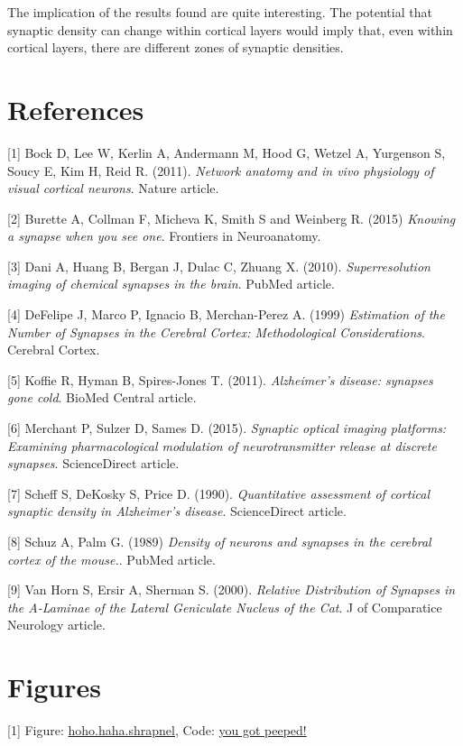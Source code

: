 \documentclass{article}
\begin{document}
The implication of the results found are quite interesting. The potential that synaptic density can change within cortical layers would imply that, even within cortical layers, there are different zones of synaptic densities.

\section{References}

[1] Bock D, Lee W, Kerlin A, Andermann M, Hood G, Wetzel A, Yurgenson S, Soucy E, Kim H, Reid R. (2011). {\it Network anatomy and in vivo physiology of visual cortical neurons}. Nature article.

[2] Burette A, Collman F, Micheva K, Smith S and Weinberg R. (2015) {\it Knowing a synapse when you see one}. Frontiers in Neuroanatomy.

[3] Dani A, Huang B, Bergan J, Dulac C, Zhuang X. (2010). {\it Superresolution imaging of chemical synapses in the brain}. PubMed article.

[4] DeFelipe J, Marco P, Ignacio B, Merchan-Perez A. (1999) {\it Estimation of the Number of Synapses in the Cerebral Cortex: Methodological Considerations}. Cerebral Cortex.

[5] Koffie R, Hyman B, Spires-Jones T. (2011). {\it Alzheimer's disease: synapses gone cold}. BioMed Central article.

[6] Merchant P, Sulzer D, Sames D. (2015). {\it Synaptic optical imaging platforms: Examining pharmacological modulation of neurotransmitter release at discrete synapses}. ScienceDirect article.

[7] Scheff S, DeKosky S, Price D. (1990). {\it Quantitative assessment of cortical synaptic density in Alzheimer's disease}. ScienceDirect article.

[8] Schuz A, Palm G. (1989) {\it Density of neurons and synapses in the cerebral cortex of the mouse.}. PubMed article.

[9] Van Horn S, Ersir A, Sherman S. (2000). {\it Relative Distribution of Synapses in the
A-Laminae of the Lateral Geniculate
Nucleus of the Cat}. J of Comparatice Neurology article.

\section{Figures}

[1] Figure: \url{hoho.haha.shrapnel}, Code: \url{you got peeped!}
\end{document}
